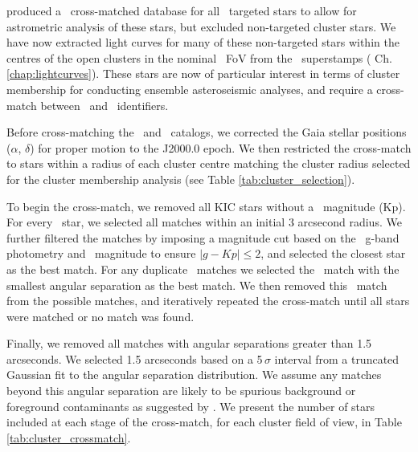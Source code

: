 \citet{berger_revised_2018} produced a \Gaia~cross-matched database for all \Kepler~targeted stars to allow for astrometric analysis of these stars, but excluded non-targeted cluster stars. We have now extracted light curves for many of these non-targeted stars within the centres of the open clusters in the nominal \Kepler~FoV from the \Kepler~superstamps (%
Ch. \ref{chap:lightcurves}). These stars are now of particular interest in terms of cluster membership for conducting ensemble asteroseismic analyses, and require a cross-match between \Kepler~and \Gaia~identifiers.

Before cross-matching the \Gaia~and \Kepler~catalogs, we corrected the Gaia stellar positions ($\alpha$, $\delta$) for proper motion to the J2000.0 epoch. We then restricted the cross-match to stars within a radius of each cluster centre matching the cluster radius selected for the cluster membership analysis (see Table \ref{tab:cluster_selection}). 

To begin the cross-match, we removed all KIC stars without a \Kepler~magnitude (Kp). For every \Gaia~star, we selected all matches within an initial 3 arcsecond radius. We further filtered the matches by imposing a magnitude cut based on the \Gaia~g-band photometry and \Kepler~magnitude to ensure ${|g-Kp| \leq 2}$, and selected the closest star as the best match. For any duplicate \Kepler~matches we selected the \Gaia~match with the smallest angular separation as the best match. We then removed this \Kepler~match from the possible matches, and iteratively repeated the cross-match until all stars were matched or no match was found. 

Finally, we removed all matches with angular separations greater than 1.5 arcseconds. We selected 1.5 arcseconds based on a 5\,$\sigma$ interval from a truncated Gaussian fit to the angular separation distribution. We assume any matches beyond this angular separation are likely to be spurious background or foreground contaminants as suggested by \citet{berger_revised_2018}. We present the number of stars included at each stage of the cross-match, for each cluster field of view, in Table \ref{tab:cluster_crossmatch}.

